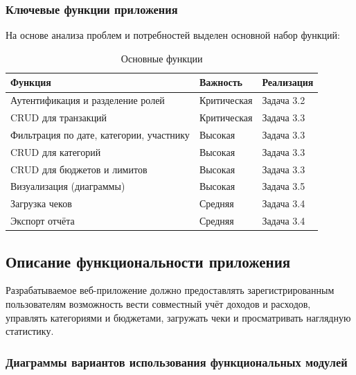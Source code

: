 \subsubsection{Ключевые функции приложения}

На основе анализа проблем и потребностей выделен основной набор функций:

\begin{table}[h]
    \centering
    \caption{Основные функции}
    \label{tab:main-functions}

    {\fontsize{12}{14}\selectfont
	\setlength{\tabcolsep}{6pt}

    \begin{tabular}{|p{8cm}|p{4cm}|p{3cm}|}
        \hline
        \textbf{Функция} & \textbf{Важность} & \textbf{Реализация} \\
        \hline
        Аутентификация и разделение ролей & Критическая & Задача 3.2 \\
        \hline
        CRUD для транзакций & Критическая & Задача 3.3 \\
        \hline
        Фильтрация по дате, категории, участнику & Высокая & Задача 3.3 \\
        \hline
        CRUD для категорий & Высокая & Задача 3.3 \\
        \hline
        CRUD для бюджетов и лимитов & Высокая & Задача 3.3 \\
        \hline
        Визуализация (диаграммы) & Высокая & Задача 3.5 \\
        \hline
        Загрузка чеков & Средняя & Задача 3.4 \\
        \hline
        Экспорт отчёта & Средняя & Задача 3.4 \\
        \hline

    \end{tabular}
    }
\end{table}

\subsection{Описание функциональности приложения}

Разрабатываемое веб-приложение должно предоставлять зарегистрированным пользователям возможность вести совместный учёт доходов и расходов, управлять категориями и бюджетами, загружать чеки и просматривать наглядную статистику. 

\subsubsection{Диаграммы вариантов использования функциональных модулей}

